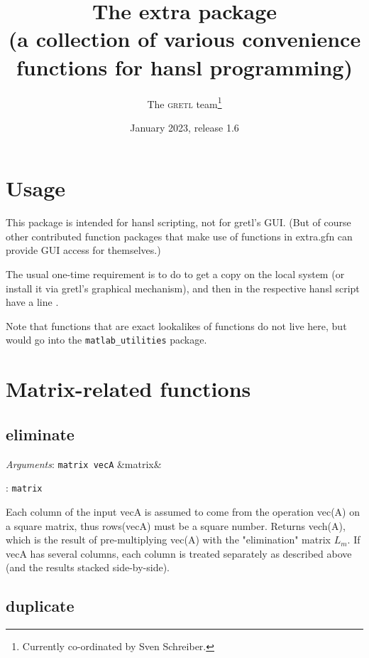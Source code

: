 \documentclass[11pt,english]{article}
\newcommand{\noun}[1]{\textsc{#1}}
\newcommand{\ArgRet}[2]{%
  {\it Arguments}: {#1}%
  \ifx&#2&%
  \else
  \par\smallskip\noindent {\it Return type}: \texttt{#2}
  \fi%
  \par\medskip\par%
  }
\begin{document}
\title{The extra package\\
(a collection of various convenience functions for hansl programming) }

\date{January 2023, release 1.6}

\author{The \noun{gretl} team\thanks{Currently co-ordinated by Sven Schreiber.}}

\maketitle
\tableofcontents{}

\section{Usage}

This package is intended for hansl scripting, not for gretl's GUI.
(But of course other contributed function packages that make use of
functions in extra.gfn can provide GUI access for themselves.)

The usual one-time requirement is to do 
to get a copy on the local system (or install it via gretl's graphical
mechanism), and then in the respective hansl script have a line .

Note that functions that are exact lookalikes of 
functions do not live here, but would go into the
\texttt{matlab\_utilities} package.


\section{Matrix-related functions}

\subsection{eliminate}

\ArgRet{\texttt{matrix vecA}}{matrix}

Each column of the input vecA is assumed to come from the operation vec(A)
on a square matrix, thus rows(vecA) must be a square number.
Returns vech(A), which is the result of pre-multiplying vec(A) with the
"elimination" matrix $L_m$.
If vecA has several columns, each column is
treated separately as described above (and the results stacked side-by-side).

\subsection{duplicate}
\end{document}
